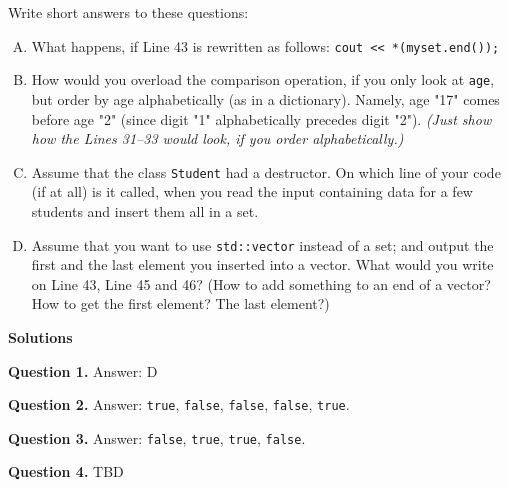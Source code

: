\documentclass[11pt]{article}
\begin{document}
\newpage
Write short answers to these questions:

\begin{enumerate}[(A)]
\item What happens, if Line 43 
is rewritten as follows:
{\tt cout << *(myset.end());}
\item How would you overload the comparison operation, 
if you only look at {\tt age}, but order by age alphabetically (as in a dictionary). 
Namely, age "17" comes before age "2" (since digit "1" alphabetically 
precedes digit "2"). 
{\em (Just show how the Lines 31--33 would look, if you order alphabetically.)}
\item Assume that the class {\tt Student} had a destructor.
On which line of your code (if at all) is it called, when you read the input containing data for a few students and insert them all in a set.
\item Assume that you want to use {\tt std::vector} instead of 
a set; and output the first and the last element you inserted into a vector. 
What would you write on Line 43, Line 45 and 46? (How to add something to an end of a vector? 
How to get the first element? The last element?)
\end{enumerate}




\newpage
{\Large \bf Solutions}

\vspace{10pt}
{\bf Question 1.} Answer: D

\vspace{10pt}
{\bf Question 2.} Answer: {\tt true}, {\tt false}, {\tt false}, {\tt false}, {\tt true}.

\vspace{10pt}
{\bf Question 3.} Answer: {\tt false}, {\tt true}, {\tt true}, {\tt false}.

\vspace{10pt}
{\bf Question 4.} TBD 
\end{document}
